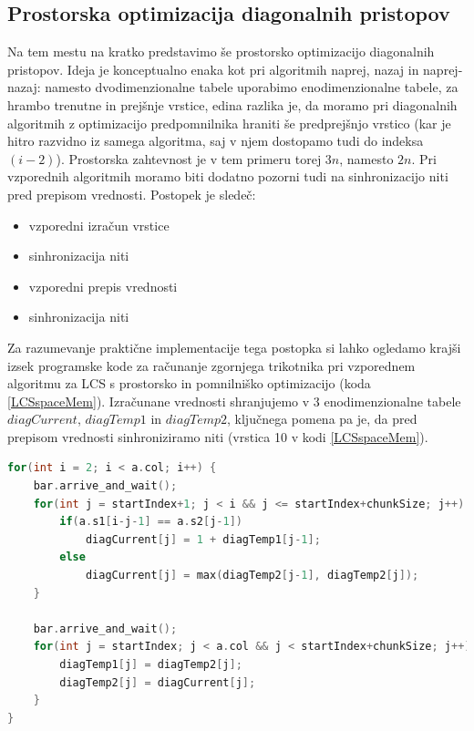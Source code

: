 \documentclass[a4paper,12pt,openright]{book}
\begin{document}
\subsection{Prostorska optimizacija diagonalnih pristopov}

Na tem mestu na kratko predstavimo še prostorsko optimizacijo diagonalnih pristopov. Ideja je konceptualno enaka kot pri algoritmih naprej, nazaj in naprej-nazaj: namesto dvodimenzionalne tabele uporabimo enodimenzionalne tabele, za hrambo trenutne in prejšnje vrstice, edina razlika je, da moramo pri diagonalnih algoritmih z optimizacijo predpomnilnika hraniti še predprejšnjo vrstico (kar je hitro razvidno iz samega algoritma, saj v njem dostopamo tudi do indeksa $(i-2)$). Prostorska zahtevnost je v tem primeru torej $3n$, namesto $2n$. Pri vzporednih algoritmih moramo biti dodatno pozorni tudi na sinhronizacijo niti pred prepisom vrednosti. Postopek je sledeč:
\begin{itemize}
\item vzporedni izračun vrstice
\item sinhronizacija niti
\item vzporedni prepis vrednosti
\item sinhronizacija niti
\end{itemize}

Za razumevanje praktične implementacije tega postopka si lahko ogledamo krajši izsek programske kode za računanje zgornjega trikotnika pri vzporednem algoritmu za LCS s prostorsko in pomnilniško optimizacijo (koda \ref{LCSspaceMem}). Izračunane vrednosti shranjujemo v 3 enodimenzionalne tabele $diagCurrent$, $diagTemp1$ in $diagTemp2$, ključnega pomena pa je, da pred prepisom vrednosti sinhroniziramo niti (vrstica 10 v kodi \ref{LCSspaceMem}). 

\bigskip
\bigskip
\begin{lstlisting}[language=C++, caption={Del kode za računanje LCS s prostorsko in pomnilniško optimizacijo}, captionpos=b, label=LCSspaceMem]
for(int i = 2; i < a.col; i++) {
    bar.arrive_and_wait();
    for(int j = startIndex+1; j < i && j <= startIndex+chunkSize; j++) {
        if(a.s1[i-j-1] == a.s2[j-1])
            diagCurrent[j] = 1 + diagTemp1[j-1];
        else
            diagCurrent[j] = max(diagTemp2[j-1], diagTemp2[j]);
    }
    
    bar.arrive_and_wait();
    for(int j = startIndex; j < a.col && j < startIndex+chunkSize; j++) {
        diagTemp1[j] = diagTemp2[j];
        diagTemp2[j] = diagCurrent[j];
    }
}
\end{lstlisting}
    
\end{document}
